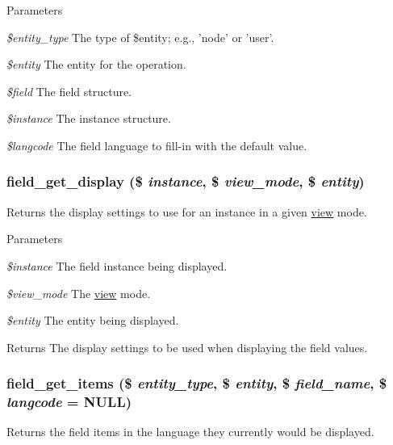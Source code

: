 \begin{DoxyParams}{Parameters}
\item[{\em \$entity\_\-type}]The type of \$entity; e.g., 'node' or 'user'. \item[{\em \$entity}]The entity for the operation. \item[{\em \$field}]The field structure. \item[{\em \$instance}]The instance structure. \item[{\em \$langcode}]The field language to fill-\/in with the default value. \end{DoxyParams}
\hypertarget{group__field_ga2dca22263fe45c35bceca2186c7ccc77}{
\subsubsection[{field\_\-get\_\-display}]{\setlength{\rightskip}{0pt plus 5cm}field\_\-get\_\-display (\$ {\em instance}, \/  \$ {\em view\_\-mode}, \/  \$ {\em entity})}}
\label{group__field_ga2dca22263fe45c35bceca2186c7ccc77}
Returns the display settings to use for an instance in a given \hyperlink{classview}{view} mode.


\begin{DoxyParams}{Parameters}
\item[{\em \$instance}]The field instance being displayed. \item[{\em \$view\_\-mode}]The \hyperlink{classview}{view} mode. \item[{\em \$entity}]The entity being displayed.\end{DoxyParams}
\begin{DoxyReturn}{Returns}
The display settings to be used when displaying the field values. 
\end{DoxyReturn}
\hypertarget{group__field_ga32f621685ff4bccfb3fa51e43f27ea57}{
\subsubsection[{field\_\-get\_\-items}]{\setlength{\rightskip}{0pt plus 5cm}field\_\-get\_\-items (\$ {\em entity\_\-type}, \/  \$ {\em entity}, \/  \$ {\em field\_\-name}, \/  \$ {\em langcode} = {\ttfamily NULL})}}
\label{group__field_ga32f621685ff4bccfb3fa51e43f27ea57}
Returns the field items in the language they currently would be displayed.


